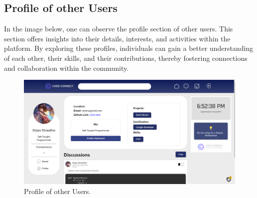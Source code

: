 \newpage
\subsection{Profile of other Users}
In the image below, one can observe the profile section of other users. This section offers insights into their details, interests, and activities within the platform. By exploring these profiles, individuals can gain a better understanding of each other, their skills, and their contributions, thereby fostering connections and collaboration within the community.
\begin{figure}[H]
    \centering
    \includegraphics[width=1\textwidth]{Outcome-ss/other-user-profile.png}
    \caption{Profile of other Users.}
    \label{fig:Profile of other Users}
\end{figure}
\newpage
